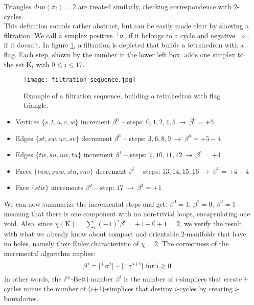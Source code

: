 Triangles $dim(\sigma_{i})=2$ are treated similarly, checking correspondence with $2$-cycles.\\
This definition sounds rather abstract, but can be easily made clear by showing a filtration.
We call a simplex positive $\Prefix^{+}{\sigma}$, if it belongs to a cycle and negative $\Prefix^{-}{\sigma}$, if it doesn't.
In figure \ref{fig:filtration_sequence}, a filtration is depicted that builds a tetrahedron with a flag.
Each step, shown by the number in the lower left box, adds one simplex to the set $\mathrm{K}_{i}$ with $0 \leq i \leq 17$.
\begin{figure}[htb]
\centering
\texttt{[image: filtration\_sequence.jpg]}
\caption{Example of a filtration sequence, building a tetrahedron with flag triangle.}
\label{fig:filtration_sequence}
\end{figure} \vspace{-2ex}
\begin{itemize}
  \setlength{\itemsep}{0cm}%
  \setlength{\parskip}{0cm}%
	\item Vertices $\{s, t, u, v, w\}$ increment $\beta^{0}$ -- steps: $0, 1, 2, 4, 5 ~\longrightarrow~ \beta^{0} = +5$
	\item Edges $\{st, sw, uv, sv\}$ decrement $\beta^{0}$ -- steps: $3, 6, 8, 9 ~\longrightarrow ~\beta^{0} = +5-4$
	\item Edges $\{tw, su, uw, tu\}$ increment $\beta^{1}$ -- steps: $7, 10, 11, 12 ~\longrightarrow ~\beta^{1} = +4$
	\item Faces $\{tuw, suw, stu, suv\}$ decrement $\beta^{1}$ -- steps: $13, 14, 15, 16 ~\longrightarrow ~\beta^{1} = +4-4$
	\item Face $\{stw\}$ increments $\beta^{2}$ -- step: $17 ~\longrightarrow ~\beta^{2} = +1$
\end{itemize}
We can now summarize the incremental steps and get: $\beta^{0} = 1, \,\beta^{1} = 0, \,\beta^{2} = 1$ meaning that there is one component with no non-trivial loops, encapsulating one void.
Also, since $\chi(\mathrm{K}) = \sum_{i} (-1)^{i}\beta^{i} = +1 -0 +1 = 2$, we verify the result with what we already know about compact and orientable $2$-manifolds that have no holes, namely their Euler characteristic of $\chi = 2$.
The correctness of the incremental algorithm implies:
\begin{equation} \label{eq:incremental_betti}
	\beta^{i} = |\Prefix^{+}{\sigma^{i}}|-|\Prefix^{-}{\sigma^{i+1}}| \text{ for } i \geq 0
\end{equation}
In other words, the $i^{th}$-Betti number $\beta^{i}$ is the number of $i$-simplices that create $i$-cycles minus the number of ($i$+1)-simplices that destroy $i$-cycles by creating $i$-boundaries.

